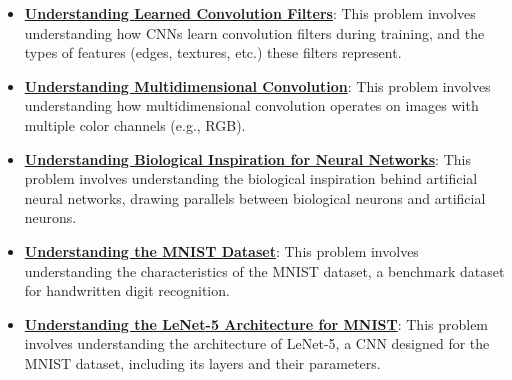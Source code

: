 \documentclass{article}%
\begin{document}
\begin{itemize}[leftmargin=*]
\item \href{https://purdue.brightspace.com/d2l/common/assets/pdfjs-d2l-dist/1.0.14-legacy/web/viewer.html?file=\%2Fcontent\%2Fenforced\%2F1095467-wl.202510.CS.24300.001\%2F09L1-cnn.pdf\%3Fou\%3D1095467\&lang=en-us\&container=d2l-fileviewer-rendered-pdf\&fullscreen=d2l-fileviewer-rendered-pdf-dialog\&height=667#page=18}{\textbf{Understanding Learned Convolution Filters}}: This problem involves understanding how CNNs learn convolution filters during training, and the types of features (edges, textures, etc.) these filters represent.%
\item \href{https://purdue.brightspace.com/d2l/common/assets/pdfjs-d2l-dist/1.0.14-legacy/web/viewer.html?file=\%2Fcontent\%2Fenforced\%2F1095467-wl.202510.CS.24300.001\%2F09L1-cnn.pdf\%3Fou\%3D1095467\&lang=en-us\&container=d2l-fileviewer-rendered-pdf\&fullscreen=d2l-fileviewer-rendered-pdf-dialog\&height=667#page=19}{\textbf{Understanding Multidimensional Convolution}}: This problem involves understanding how multidimensional convolution operates on images with multiple color channels (e.g., RGB).%
\item \href{https://purdue.brightspace.com/d2l/common/assets/pdfjs-d2l-dist/1.0.14-legacy/web/viewer.html?file=\%2Fcontent\%2Fenforced\%2F1095467-wl.202510.CS.24300.001\%2F09L1-cnn.pdf\%3Fou\%3D1095467\&lang=en-us\&container=d2l-fileviewer-rendered-pdf\&fullscreen=d2l-fileviewer-rendered-pdf-dialog\&height=667#page=20}{\textbf{Understanding Biological Inspiration for Neural Networks}}: This problem involves understanding the biological inspiration behind artificial neural networks, drawing parallels between biological neurons and artificial neurons.%
\item \href{https://purdue.brightspace.com/d2l/common/assets/pdfjs-d2l-dist/1.0.14-legacy/web/viewer.html?file=\%2Fcontent\%2Fenforced\%2F1095467-wl.202510.CS.24300.001\%2F09L1-cnn.pdf\%3Fou\%3D1095467\&lang=en-us\&container=d2l-fileviewer-rendered-pdf\&fullscreen=d2l-fileviewer-rendered-pdf-dialog\&height=667#page=21}{\textbf{Understanding the MNIST Dataset}}: This problem involves understanding the characteristics of the MNIST dataset, a benchmark dataset for handwritten digit recognition.%
\item \href{https://purdue.brightspace.com/d2l/common/assets/pdfjs-d2l-dist/1.0.14-legacy/web/viewer.html?file=\%2Fcontent\%2Fenforced\%2F1095467-wl.202510.CS.24300.001\%2F09L1-cnn.pdf\%3Fou\%3D1095467\&lang=en-us\&container=d2l-fileviewer-rendered-pdf\&fullscreen=d2l-fileviewer-rendered-pdf-dialog\&height=667#page=22}{\textbf{Understanding the LeNet{-}5 Architecture for MNIST}}: This problem involves understanding the architecture of LeNet-5, a CNN designed for the MNIST dataset, including its layers and their parameters.%

\end{itemize}
\end{document}
